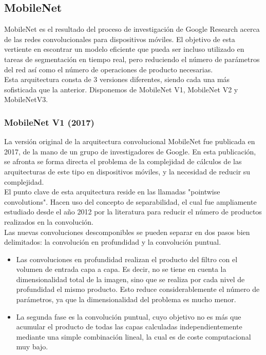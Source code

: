 \subsection{MobileNet}

MobileNet es el resultado del proceso de investigación de Google Research acerca de las redes convolucionales para dispositivos móviles. El objetivo de esta vertiente en escontrar un modelo eficiente que pueda ser incluso utilizado en tareas de segmentación en tiempo real, pero reduciendo el número de parámetros del red así como el número de operaciones de producto necesarias.\\

Esta arquitectura consta de 3 versiones diferentes, siendo cada una más sofisticada que la anterior. Disponemos de MobileNet V1, MobileNet V2 y MobileNetV3.

\subsubsection{MobileNet V1 (2017)}

La versión original de la arquitectura convolucional MobileNet fue publicada en 2017, de la mano de un grupo de investigadores de Google. En esta publicación, se afronta se forma directa el problema de la complejidad de cálculos de las arquitecturas de este tipo en dispositivos móviles, y la necesidad de reducir su complejidad.\\
El punto clave de esta arquitectura reside en las llamadas "pointwise convolutions". Hacen uso del concepto de separabilidad, el cual fue ampliamente estudiado desde el año 2012 por la literatura para reducir el número de productos realizados en la convolución.\\ 

Las nuevas convoluciones descomponibles se pueden separar en dos pasos bien delimitados: la convolución en profundidad y la convolución puntual.

\begin{itemize}
    \item Las convoluciones en profundidad realizan el producto del filtro con el volumen de entrada capa a capa. Es decir, no se tiene en cuenta la dimensionalidad total de la imagen, sino que se realiza por cada nivel de profundidad el mismo producto. Esto reduce considerablemente el número de parámetros, ya que la dimensionalidad del problema es mucho menor.
    \item La segunda fase es la convolución puntual, cuyo objetivo no es más que acumular el producto de todas las capas calculadas independientemente mediante una simple combinación lineal, la cual es de coste computacional muy bajo.
\end{itemize}

